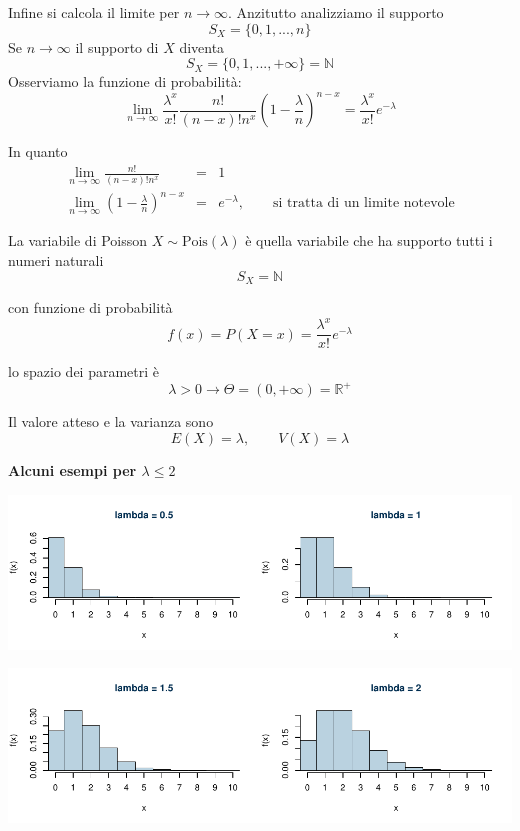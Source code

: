 \documentclass[
  11pt,
]{book}
\theoremstyle{mytheoremstyle}
\theoremstyle{mydefstyle}
\begin{document}
Infine si calcola il limite per \(n\to\infty\).
Anzitutto analizziamo il supporto
\[S_X=\{0,1,...,n\}\]
Se \(n\to\infty\) il supporto di \(X\) diventa
\[S_X=\{0,1,...,+\infty\}=\mathbb{N}\]
Osserviamo la funzione di probabilità:
\[\lim_{n\to\infty}\frac{\lambda^x}{x!}\frac{n!}{(n-x)! n^x}\left(1-\frac\lambda n\right)^{n-x} =\frac{\lambda^x}{x!}e^{-\lambda}\]

In quanto
\begin{eqnarray*}
  \lim_{n\to\infty}\frac{n!}{(n-x)! n^x} &=& 1\\
  \lim_{n\to\infty}\left(1-\frac\lambda n\right)^{n-x}    &=& e^{-\lambda},\qquad \text{si tratta di un limite notevole}
\end{eqnarray*}

La variabile di Poisson \(X\sim \text{Pois}(\lambda)\) è quella variabile che ha supporto tutti i numeri naturali
\[S_X=\mathbb{N}\]

con funzione di probabilità
\[f(x)=P(X=x)=\frac{\lambda^x}{x!}e^{-\lambda}\]

lo spazio dei parametri è
\[\lambda>0 \rightarrow \Theta=(0,+\infty)=\mathbb{R}^+\]

Il valore atteso e la varianza sono
\[E(X)=\lambda,\qquad V(X)=\lambda\]

\textbf{Alcuni esempi per \(\lambda\le 2\)}

\begin{center}\includegraphics{Appunti_di_Statistica_2025_files/figure-latex/07b-Poisson-1-1} \end{center}

\begin{center}\includegraphics{Appunti_di_Statistica_2025_files/figure-latex/07b-Poisson-2-1} \end{center}
\end{document}
